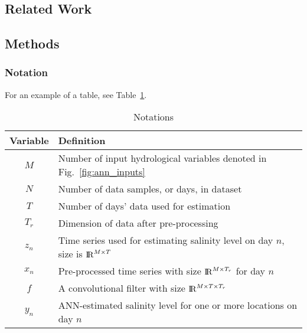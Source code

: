 
\blindtext 
\blindtext

\subsection{Related Work}

\blindtext
\blindtext
\blindtext

\subsection{Methods}

\blindtext

\subsubsection{Notation}

For an example of a table, see Table~\ref{table:notation}.

\begin{table}[htb]
	\caption{Notations}
	\label{table:notation}
	\centering
	\begin{tabular}[]{c|l}
		\toprule
		Variable & Definition \\
		\midrule
		$M$ & Number of input hydrological variables denoted in Fig.~\ref{fig:ann_inputs}\\
		\hline
		$N$ & Number of data samples, or days, in dataset \\
		\hline
		$T$ & Number of days' data used for estimation \\
		\hline
		$T_r$ & Dimension of data after pre-processing\\
		\hline
		$z_{n}$ & Time series used for estimating salinity level on day $n$, size is ${\rm I\!R}^{M\times T}$ \\
		\hline
		$x_{n}$ & Pre-processed time series with size ${\rm I\!R}^{M\times T_r}$ for day $n$\\
		\hline
		$f$ & A convolutional filter with size ${\rm I\!R}^{M \times T \times T_r}$ \\
		\hline
		$y_{n}$ & ANN-estimated salinity level for one or more locations on day $n$ \\
		\bottomrule
	\end{tabular}
\end{table}


